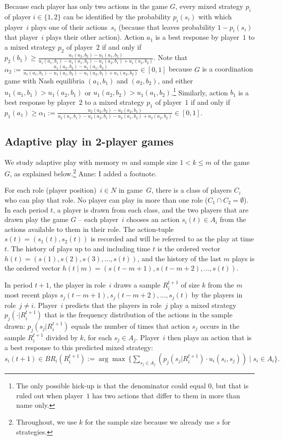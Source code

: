 \documentclass[11.5pt]{article}
\begin{document}
Because each player has only two actions in the game $G$, every mixed strategy $p_i$ of player $i\in \{1,2\}$ can be identified by the probability $p_i(s_i)$ with which player~$i$ plays one of their actions~$s_i$ (because that leaves probability $1-p_i(s_i)$ that player~$i$ plays their other action). 
%
Action $a_1$ is a best response by player~$1$ to a mixed strategy $p_2$ of player~$2$ if and only if 
$p_2(b_1) \geq \frac{u_1(a_2,b_2)-u_1(a_1,b_2)}{u_1(a_1,b_1)-u_1(a_1,b_2)-u_1(a_2,b_1)+u_1(a_2,b_2)}.$ Note that $\alpha_2 :=\frac{u_1(a_2,b_2)-u_1(a_1,b_2)}{u_1(a_1,b_1)-u_1(a_1,b_2)-u_1(a_2,b_1)+u_1(a_2,b_2)}\in [0,1]$ because $G$ is a coordination game with Nash equilibria $(a_1,b_1)$ and $(a_2,b_2)$, and either $u_1(a_1,b_1) > u_1(a_2,b_1)$ or $u_1(a_2,b_2) > u_1(a_1,b_2)$.\footnote{The only possible hick-up is that the denominator could equal 0, but that is ruled out when player~$1$ has two actions that differ to them in more than name only.}
%
Similarly, action $b_1$ is a best response by player~$2$ to a mixed strategy $p_1$ of player~$1$ if and only if 
$p_1(a_1) \geq \alpha_1 := \frac{u_2(a_2,b_2)-u_2(a_2,b_1)}{u_2(a_1,b_1)-u_2(a_2,b_1)-u_2(a_1,b_2)+u_2(a_2,b_2)} \in [0,1]$.


\subsection{Adaptive play in 2-player games}
 
We study adaptive play \citep{young1993evolution} with memory $m$ and sample size $1<k\leq m$ of the game~$G$, as explained below.\footnote{Throughout, we use $k$ for the sample size because we already use $s$ for strategies.} 
Anne: I added a footnote.

For each role (player position)~$i\in N$ in game~$G$, there is a class of players $C_i$ who can play that role. No player can play in more than one role ($C_1\cap C_2=\emptyset$). 
In each period $t$, a player is drawn from each class, and the two players that are drawn play the game $G$ -- each player~$i$ chooses an action $s_i(t)\in A_i$ from the actions available to them in their role. 
The action-tuple $s(t) = (s_1(t), s_2(t))$ is recorded and will be referred to as the play at time $t$. 
The history of plays up to and including time $t$ is the ordered vector $h(t) = (s(1), s(2), s(3), ..., s(t))$, and the history of the last $m$ plays is the ordered vector $h(t\mid m) = (s(t-m+1), s(t-m+2), ..., s(t))$.

In period $t+1$, the player in role~$i$ draws a sample $R_i^{t+1}$ of size $k$ from the $m$ most recent plays $s_j(t-m+1), s_j(t-m+2), \ldots, s_j(t)$ by the players in role~$j\neq i$. 
Player~$i$ predicts that the players in role~$j$ play a mixed strategy $p_j(\cdot | R_i^{t+1})$ that is the frequency distribution of the actions in the sample drawn: $p_j(s_j | R_i^{t+1})$ equals the number of times that action $s_j$ occurs in the sample $R_i^{t+1}$ divided by $k$, for each $s_j\in A_j$. 
%
Player~$i$ then plays an action that is a best response to this predicted mixed strategy:  
$s_i(t+1)\in BR_i(R_i^{t+1}):=\arg\max \,\{ \sum_{s_j\in A_j} \left( p_j(s_j | R_i^{t+1})\cdot u_i(s_i,s_j) \right) \mid s_i\in A_i \} .$
\end{document}
